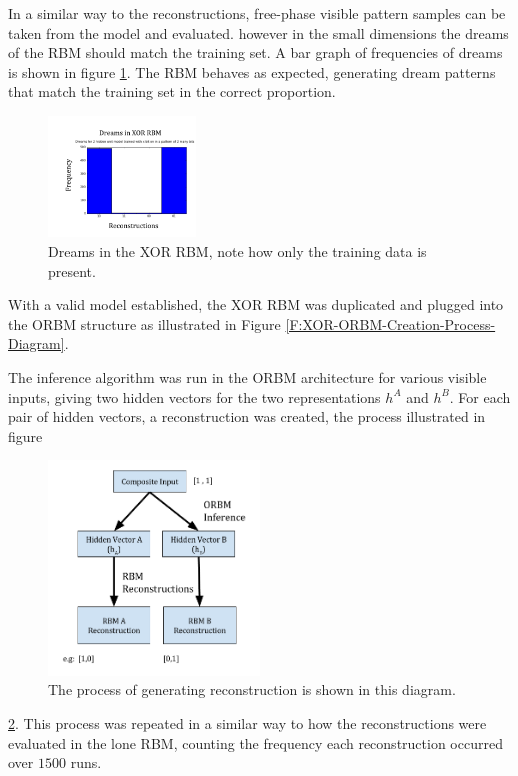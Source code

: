 In a similar way to the reconstructions, free-phase visible pattern samples can be taken from the model and evaluated.  however in the small dimensions the dreams of the RBM should match the training set. A bar graph of frequencies of dreams is shown in figure \ref{F:Two-Bit-RBM-Dreams}. The RBM behaves as expected, generating dream patterns that match the training set in the correct proportion.
\begin{figure}
  \begin{center}
    \includegraphics[width=0.35\textwidth]{Assets/XOR-RBM-Dreams.png}
  \end{center}
  \caption{Dreams in the XOR RBM, note how only the training data is present.}
  \label{F:Two-Bit-RBM-Dreams}
\end{figure}
With a valid model established, the XOR RBM was duplicated and plugged into the ORBM structure as illustrated in Figure \ref{F:XOR-ORBM-Creation-Process-Diagram}.

The inference algorithm was run in the ORBM architecture for various visible inputs, giving two hidden vectors for the two representations $h^A$ and $h^B$. For each pair of hidden vectors, a reconstruction was created, the process illustrated in figure
\begin{figure}[h]
  \begin{center}
    \includegraphics[width=0.5\textwidth]{Assets/XOR-2-Bit-Process-Diagram.png}
  \end{center}
  \caption{The process of generating reconstruction is shown in this diagram.}

  \label{F:Two-Bit-ORBM-Process-Diagram}
\end{figure}
 \ref{F:Two-Bit-ORBM-Process-Diagram}. This process was repeated in a similar way to how the reconstructions were evaluated in the lone RBM, counting the frequency each reconstruction occurred over $1500$ runs.

